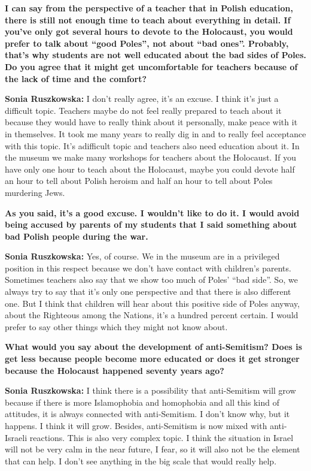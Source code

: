 \textbf{I can say from the perspective of a teacher that in Polish education, there is still not enough time to teach about everything in detail. If you've only got several hours to devote to the Holocaust, you would prefer to talk about ``good Poles'', not about ``bad ones''. Probably, that’s why students are not well educated about the bad sides of Poles. Do you agree that it might get uncomfortable for teachers because of the lack of time and the comfort?} 

\textbf{Sonia Ruszkowska:} I don’t really agree, it’s an excuse. I think it’s just a difficult topic. Teachers maybe do not feel really prepared to teach about it because they would have to really think about it personally, make peace with it in themselves. It took me many years to really dig in and to really feel acceptance with this topic. It’s adifficult topic and teachers also need education about it. In the museum we make many workshops for teachers about the Holocaust. If you have only one hour to teach about the Holocaust, maybe you could devote half an hour to tell about Polish heroism and half an hour to tell about Poles murdering Jews. 

\textbf{As you said, it’s a good excuse. I wouldn’t like to do it. I would avoid being accused by parents of my students that I said something about bad Polish people during the war.} 

\textbf{Sonia Ruszkowska:} Yes, of course. We in the museum are in a privileged position in this respect because we don’t have contact with children’s parents. Sometimes teachers also say that we show too much of Poles’ ``bad side''. So, we always try to say that it’s only one perspective and that there is also different one. But I think that children will hear about this positive side of Poles anyway, about the Righteous among the Nations, it’s a hundred percent certain. I would prefer to say other things which they might not know about. 

\textbf{What would you say about the development of anti-Semitism? Does is get less because people become more educated or does it get stronger because the Holocaust happened seventy years ago?} 

\textbf{Sonia Ruszkowska:} I think there is a possibility that anti-Semitism will grow because if there is more Islamophobia and homophobia and all this kind of attitudes, it is always connected with anti-Semitism. I don’t know why, but it happens. I think it will grow. Besides, anti-Semitism is now mixed with anti-Israeli reactions. This is also very complex topic. I think the situation in Israel will not be very calm in the near future, I fear, so it will also not be the element that can help. I don’t see anything in the big scale that would really help. 
 
